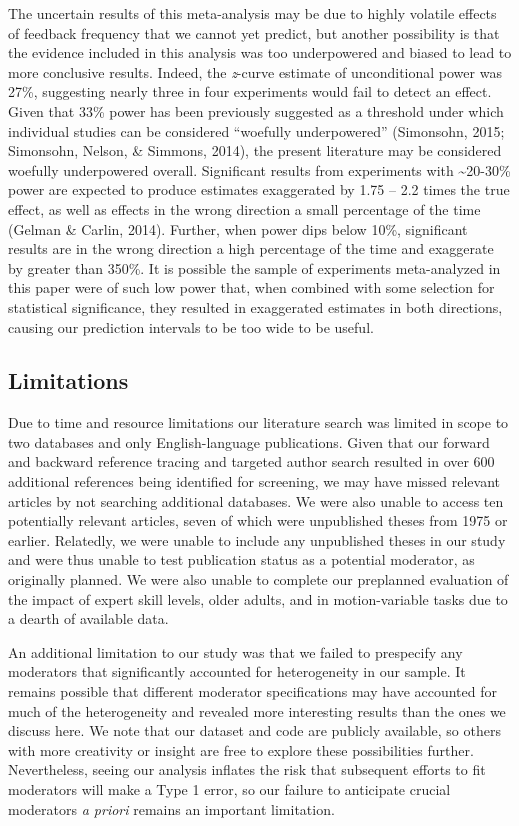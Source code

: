 \documentclass[
  english,
  man,mask,floatsintext]{apa7}
\begin{document}
The uncertain results of this meta-analysis may be due to highly volatile effects of feedback frequency that we cannot yet predict, but another possibility is that the evidence included in this analysis was too underpowered and biased to lead to more conclusive results. Indeed, the \emph{z}-curve estimate of unconditional power was 27\%, suggesting nearly three in four experiments would fail to detect an effect. Given that 33\% power has been previously suggested as a threshold under which individual studies can be considered ``woefully underpowered'' (Simonsohn, 2015; Simonsohn, Nelson, \& Simmons, 2014), the present literature may be considered woefully underpowered overall. Significant results from experiments with \textasciitilde20-30\% power are expected to produce estimates exaggerated by 1.75 -- 2.2 times the true effect, as well as effects in the wrong direction a small percentage of the time (Gelman \& Carlin, 2014). Further, when power dips below 10\%, significant results are in the wrong direction a high percentage of the time and exaggerate by greater than 350\%. It is possible the sample of experiments meta-analyzed in this paper were of such low power that, when combined with some selection for statistical significance, they resulted in exaggerated estimates in both directions, causing our prediction intervals to be too wide to be useful.

\hypertarget{limitations}{%
\subsection{Limitations}\label{limitations}}

Due to time and resource limitations our literature search was limited in scope to two databases and only English-language publications. Given that our forward and backward reference tracing and targeted author search resulted in over 600 additional references being identified for screening, we may have missed relevant articles by not searching additional databases. We were also unable to access ten potentially relevant articles, seven of which were unpublished theses from 1975 or earlier. Relatedly, we were unable to include any unpublished theses in our study and were thus unable to test publication status as a potential moderator, as originally planned. We were also unable to complete our preplanned evaluation of the impact of expert skill levels, older adults, and in motion-variable tasks due to a dearth of available data.

An additional limitation to our study was that we failed to prespecify any moderators that significantly accounted for heterogeneity in our sample. It remains possible that different moderator specifications may have accounted for much of the heterogeneity and revealed more interesting results than the ones we discuss here. We note that our dataset and code are publicly available, so others with more creativity or insight are free to explore these possibilities further. Nevertheless, seeing our analysis inflates the risk that subsequent efforts to fit moderators will make a Type 1 error, so our failure to anticipate crucial moderators \emph{a priori} remains an important limitation.
\end{document}
